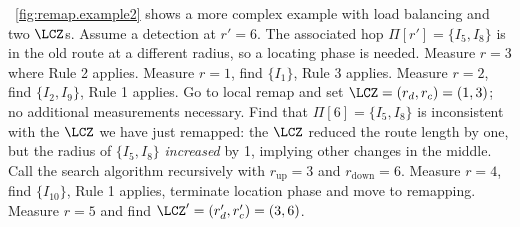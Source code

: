 \figstr~\ref{fig:remap.example2} shows a more complex example with
load balancing and two $\LCZ$s.  Assume a detection at $r' = 6$. The
associated hop $\Pi[r'] = \{I_5, I_8\}$ is in the old route at a
different radius, so a locating phase is needed.  Measure $r = 3$ where
Rule 2 applies.  Measure $r = 1$, find $\{I_1\}$, Rule 3 applies.
Measure $r = 2$, find $\{I_2, I_9\}$, Rule 1 applies.  Go to local remap
and set $\LCZ = (r_d, r_c)=(1,3)$; no additional measurements necessary.
Find that $\Pi[6] = \{I_5, I_8\}$ is inconsistent with the $\LCZ$ we
have just remapped: the $\LCZ$ reduced the route length by one, but the
radius of $\{I_5, I_8\}$ \emph{increased} by 1, implying other changes
in the middle.  Call the search algorithm recursively with
$r_\mathrm{up} = 3$ and $r_\mathrm{down} = 6$.  Measure $r = 4$, find
$\{I_{10}\}$,  Rule 1 applies, terminate location phase and move to
remapping.  Measure $r = 5$ and find $\LCZ' = (r'_d, r'_c) = (3, 6)$.

